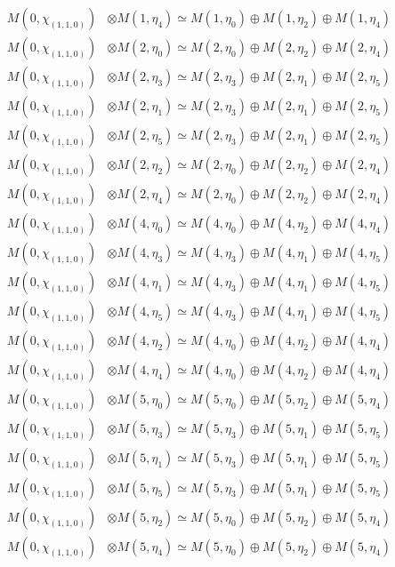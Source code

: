 \begin{align*}
M(0,\chi_{(1,1,0)}) &\otimes M(1,\eta_{4}) \simeq M(1,\eta_{0}) \oplus M(1,\eta_{2}) \oplus M(1,\eta_{4})\\
M(0,\chi_{(1,1,0)}) &\otimes M(2,\eta_{0}) \simeq M(2,\eta_{0}) \oplus M(2,\eta_{2}) \oplus M(2,\eta_{4})\\
M(0,\chi_{(1,1,0)}) &\otimes M(2,\eta_{3}) \simeq M(2,\eta_{3}) \oplus M(2,\eta_{1}) \oplus M(2,\eta_{5})\\
M(0,\chi_{(1,1,0)}) &\otimes M(2,\eta_{1}) \simeq M(2,\eta_{3}) \oplus M(2,\eta_{1}) \oplus M(2,\eta_{5})\\
M(0,\chi_{(1,1,0)}) &\otimes M(2,\eta_{5}) \simeq M(2,\eta_{3}) \oplus M(2,\eta_{1}) \oplus M(2,\eta_{5})\\
M(0,\chi_{(1,1,0)}) &\otimes M(2,\eta_{2}) \simeq M(2,\eta_{0}) \oplus M(2,\eta_{2}) \oplus M(2,\eta_{4})\\
M(0,\chi_{(1,1,0)}) &\otimes M(2,\eta_{4}) \simeq M(2,\eta_{0}) \oplus M(2,\eta_{2}) \oplus M(2,\eta_{4})\\
M(0,\chi_{(1,1,0)}) &\otimes M(4,\eta_{0}) \simeq M(4,\eta_{0}) \oplus M(4,\eta_{2}) \oplus M(4,\eta_{4})\\
M(0,\chi_{(1,1,0)}) &\otimes M(4,\eta_{3}) \simeq M(4,\eta_{3}) \oplus M(4,\eta_{1}) \oplus M(4,\eta_{5})\\
M(0,\chi_{(1,1,0)}) &\otimes M(4,\eta_{1}) \simeq M(4,\eta_{3}) \oplus M(4,\eta_{1}) \oplus M(4,\eta_{5})\\
M(0,\chi_{(1,1,0)}) &\otimes M(4,\eta_{5}) \simeq M(4,\eta_{3}) \oplus M(4,\eta_{1}) \oplus M(4,\eta_{5})\\
M(0,\chi_{(1,1,0)}) &\otimes M(4,\eta_{2}) \simeq M(4,\eta_{0}) \oplus M(4,\eta_{2}) \oplus M(4,\eta_{4})\\
M(0,\chi_{(1,1,0)}) &\otimes M(4,\eta_{4}) \simeq M(4,\eta_{0}) \oplus M(4,\eta_{2}) \oplus M(4,\eta_{4})\\
M(0,\chi_{(1,1,0)}) &\otimes M(5,\eta_{0}) \simeq M(5,\eta_{0}) \oplus M(5,\eta_{2}) \oplus M(5,\eta_{4})\\
M(0,\chi_{(1,1,0)}) &\otimes M(5,\eta_{3}) \simeq M(5,\eta_{3}) \oplus M(5,\eta_{1}) \oplus M(5,\eta_{5})\\
M(0,\chi_{(1,1,0)}) &\otimes M(5,\eta_{1}) \simeq M(5,\eta_{3}) \oplus M(5,\eta_{1}) \oplus M(5,\eta_{5})\\
M(0,\chi_{(1,1,0)}) &\otimes M(5,\eta_{5}) \simeq M(5,\eta_{3}) \oplus M(5,\eta_{1}) \oplus M(5,\eta_{5})\\
M(0,\chi_{(1,1,0)}) &\otimes M(5,\eta_{2}) \simeq M(5,\eta_{0}) \oplus M(5,\eta_{2}) \oplus M(5,\eta_{4})\\
M(0,\chi_{(1,1,0)}) &\otimes M(5,\eta_{4}) \simeq M(5,\eta_{0}) \oplus M(5,\eta_{2}) \oplus M(5,\eta_{4})\\
\end{align*}

